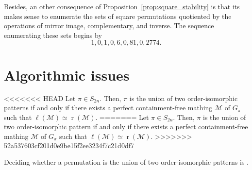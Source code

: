 \documentclass[a4paper,10pt]{llncs}
\DeclareMathOperator{\LEFT}{\ell}
\DeclareMathOperator{\RIGHT}{r}
\begin{document}
Besides, an other consequence of Proposition~\ref{prop:square_stability}
is that its makes sense to enumerate the sets of square permutations
quotiented by the operations of mirror image, complementary, and
inverse. The sequence enumerating these sets begins by
\begin{equation}
    1, 0, 1, 0, 6, 0, 81, 0, 2774.
\end{equation}
\medskip


\section{Algorithmic issues}
\label{section:Algorithmic issues}


\begin{proposition}
<<<<<<< HEAD
  \label{proposition:matching}
  Let $\pi \in S_{2n}$.
  Then,
  $\pi$ is the union of two order-isomorphic patterns
  if and only if
  there exists a perfect containment-free mathing
  $\mathcal{M}$ of $G_\pi$ such that
  $\LEFT(\mathcal{M}) \simeq \RIGHT(\mathcal{M})$.
=======
Let $\pi \in S_{2n}$.
Then,
$\pi$ is the union of two order-isomorphic pattern
if and only if
there exists a perfect containment-free mathing
$\mathcal{M}$ of $G_\pi$ such that
$\LEFT(\mathcal{M}) \simeq \RIGHT(\mathcal{M})$.
>>>>>>> 52a537603cf201d0e9be15f2ee3234f7c21d0df7
\end{proposition}

\begin{proposition}
  \label{proposition:hardness}
  Deciding whether a permutation is the union of two
  order-isomorphic patterns is \NPC.
\end{proposition}
\end{document}
